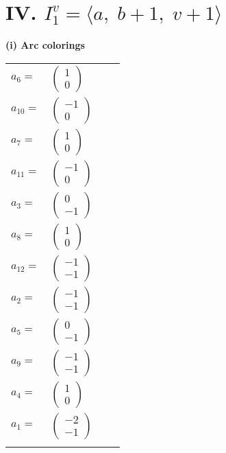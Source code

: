 \documentclass[1p]{elsarticle_modified}
\theoremstyle{definition}
\begin{document}
\centering \section*{IV. $I^v_{1}= \langle a,\;b+1,\;v+1 \rangle$}
\flushleft \textbf{(i) Arc colorings}\\
\begin{tabular}{m{7pt} m{180pt} m{7pt} m{180pt} }
\flushright $a_{6}=$&$\begin{pmatrix}1\\0\end{pmatrix}$ \\
\flushright $a_{10}=$&$\begin{pmatrix}-1\\0\end{pmatrix}$ \\
\flushright $a_{7}=$&$\begin{pmatrix}1\\0\end{pmatrix}$ \\
\flushright $a_{11}=$&$\begin{pmatrix}-1\\0\end{pmatrix}$ \\
\flushright $a_{3}=$&$\begin{pmatrix}0\\-1\end{pmatrix}$ \\
\flushright $a_{8}=$&$\begin{pmatrix}1\\0\end{pmatrix}$ \\
\flushright $a_{12}=$&$\begin{pmatrix}-1\\-1\end{pmatrix}$ \\
\flushright $a_{2}=$&$\begin{pmatrix}-1\\-1\end{pmatrix}$ \\
\flushright $a_{5}=$&$\begin{pmatrix}0\\-1\end{pmatrix}$ \\
\flushright $a_{9}=$&$\begin{pmatrix}-1\\-1\end{pmatrix}$ \\
\flushright $a_{4}=$&$\begin{pmatrix}1\\0\end{pmatrix}$ \\
\flushright $a_{1}=$&$\begin{pmatrix}-2\\-1\end{pmatrix}$\\&\end{tabular}
\end{document}
